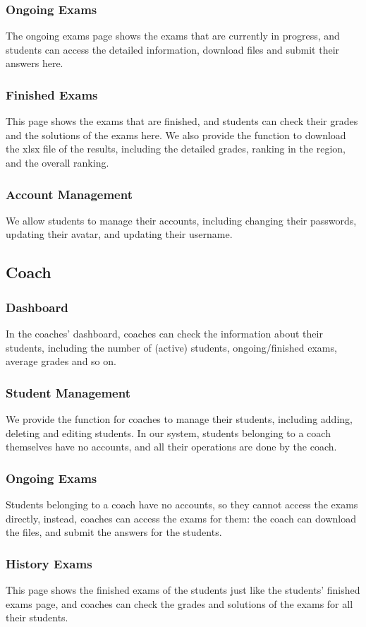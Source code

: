 \documentclass[12pt]{article}
\begin{document}
\subsubsection{Ongoing Exams}
The ongoing exams page shows the exams that are currently in progress, and students can access the detailed information,
download files and submit their answers here.
\subsubsection{Finished Exams}
This page shows the exams that are finished, and students can check their grades and the solutions of the exams here.
We also provide the function to download the xlsx file of the results, including the detailed grades, ranking in the region, and the overall ranking.
\subsubsection{Account Management}
We allow students to manage their accounts, including changing their passwords, updating their avatar, and updating their username.
\subsection{Coach}
\subsubsection{Dashboard}
In the coaches' dashboard, coaches can check the information about their students, including the number of (active) students, ongoing/finished exams,
average grades and so on.
\subsubsection{Student Management}
We provide the function for coaches to manage their students, including adding, deleting and editing students.
In our system, students belonging to a coach themselves have no accounts, and all their operations are done by the coach.
\subsubsection{Ongoing Exams}
Students belonging to a coach have no accounts, so they cannot access the exams directly, instead, coaches can access the exams
for them: the coach can download the files, and submit the answers for the students.
\subsubsection{History Exams}
This page shows the finished exams of the students just like the students' finished exams page, and coaches can check the grades and solutions of the exams
for all their students.
\end{document}
